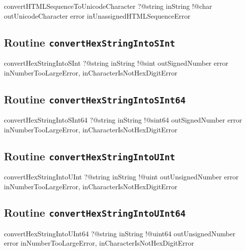 \begin{galgas3}
convertHTMLSequenceToUnicodeCharacter ?@string inString
                                      !@char outUnicodeCharacter
                                      error inUnassignedHTMLSequenceError
\end{galgas3}

\subsection{Routine \texttt{convertHexStringIntoSInt}}

\begin{galgas3}
convertHexStringIntoSInt ?@string inString
                         !@sint outSignedNumber
                         error inNumberTooLargeError,
                               inCharacterIsNotHexDigitError
\end{galgas3}

\subsection{Routine \texttt{convertHexStringIntoSInt64}}

\begin{galgas3}
convertHexStringIntoSInt64 ?@string inString
                           !@sint64 outSignedNumber
                           error inNumberTooLargeError,
                                 inCharacterIsNotHexDigitError
\end{galgas3}

\subsection{Routine \texttt{convertHexStringIntoUInt}}

\begin{galgas3}
convertHexStringIntoUInt ?@string inString
                         !@uint outUnsignedNumber
                         error inNumberTooLargeError,
                               inCharacterIsNotHexDigitError
\end{galgas3}

\subsection{Routine \texttt{convertHexStringIntoUInt64}}

\begin{galgas3}
convertHexStringIntoUInt64 ?@string inString
                           !@uint64 outUnsignedNumber
                           error inNumberTooLargeError,
                                 inCharacterIsNotHexDigitError
\end{galgas3}

